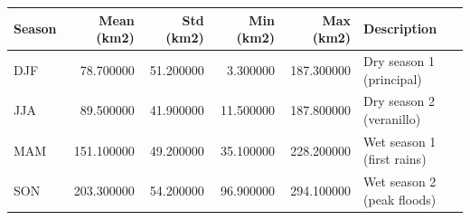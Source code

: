 \begin{tabular}{lrrrrl}
\toprule
Season & Mean (km2) & Std (km2) & Min (km2) & Max (km2) & Description \\
\midrule
DJF & 78.700000 & 51.200000 & 3.300000 & 187.300000 & Dry season 1 (principal) \\
JJA & 89.500000 & 41.900000 & 11.500000 & 187.800000 & Dry season 2 (veranillo) \\
MAM & 151.100000 & 49.200000 & 35.100000 & 228.200000 & Wet season 1 (first rains) \\
SON & 203.300000 & 54.200000 & 96.900000 & 294.100000 & Wet season 2 (peak floods) \\
\bottomrule
\end{tabular}
